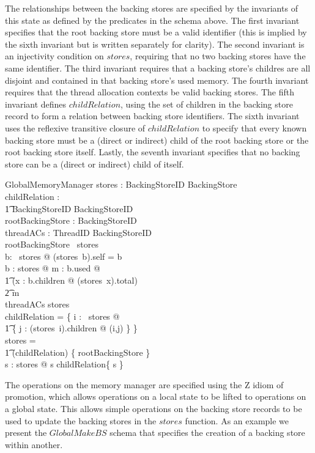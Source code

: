 \documentclass[a4paper,10pt]{article}
\begin{document}
The relationships between the backing stores are specified by the invariants of
this state as defined by the predicates in the schema above. The first invariant
specifies that the root backing store must be a valid identifier (this is
implied by the sixth invariant but is written separately for clarity). The
second invariant is an injectivity condition on $stores$, requiring that no two
backing stores have the same identifier. The third invariant requires that a
backing store's childres are all disjoint and contained in that backing store's 
used memory. The fourth invariant requires that
the thread allocation contexts be valid backing stores. The fifth invariant 
defines $childRelation$, using the set of children in the backing store record
to form a relation between backing store identifiers. The sixth invariant uses
the reflexive transitive closure of $childRelation$ to specify that every known
backing store must be a (direct or indirect) child of the root backing store or
the root backing store itself. Lastly, the seventh invariant specifies that no
backing store can be a (direct or indirect) child of itself.
%
\begin{schema}{GlobalMemoryManager}
  stores : BackingStoreID \pfun BackingStore \\
  childRelation : \\
    \t1 BackingStoreID \rel BackingStoreID \\
  rootBackingStore : BackingStoreID \\
  threadACs : ThreadID \pfun BackingStoreID \\
\where
  rootBackingStore \in \dom~stores \\
  \forall b: \dom~stores @ (stores~b).self = b \\
  \forall b : \ran stores @ \exists m : \power b.used @ \\
    \t1 (\lambda x : b.children @ (stores~x).total) \\
    \t2 \partition m \\
  \ran threadACs \subseteq \dom stores \\
  childRelation = \bigcup \{ i : \dom~stores @ \\ 
    \t1 \{ j : (stores~i).children @ (i,j) \} \} \\
  \dom stores = \\
    \t1 (childRelation\star) \limg \{ rootBackingStore \} \rimg \\
  \forall s : \dom stores @ s \notin childRelation\plus \limg \{ s \} \rimg \\
\end{schema}
%
The operations on the memory manager are specified using the Z idiom of
promotion, which allows operations on a local state to be lifted to operations on
a global state.  This allows simple operations on the backing store records to be
used to update the backing stores in the $stores$ function.  As an
example we present the $GlobalMakeBS$ schema that specifies the creation of a
backing store within another.
\end{document}
